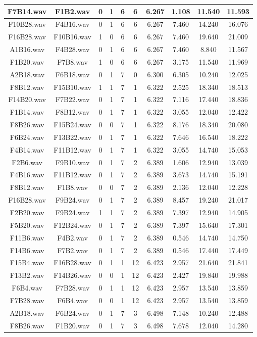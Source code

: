 \documentclass[11pt,a4paper]{book}
\begin{document}
\begin{longtable}[c]{|c|c|c|c|c|c|c|c|c|c|}
F7B14.wav&F1B2.wav&0&1&6&6&6.267&1.108&11.540&11.593\\ \hline
F10B28.wav&F4B16.wav&0&1&6&6&6.267&7.460&14.240&16.076\\ \hline
F16B28.wav&F10B16.wav&1&0&6&6&6.267&7.460&19.640&21.009\\ \hline
A1B16.wav&F4B28.wav&0&1&6&6&6.267&7.460&8.840&11.567\\ \hline
F1B20.wav&F7B8.wav&1&0&6&6&6.267&3.175&11.540&11.969\\ \hline
A2B18.wav&F6B18.wav&0&1&7&0&6.300&6.305&10.240&12.025\\ \hline
F8B12.wav&F15B10.wav&1&1&7&1&6.322&2.525&18.340&18.513\\ \hline
F14B20.wav&F7B22.wav&0&1&7&1&6.322&7.116&17.440&18.836\\ \hline
F1B14.wav&F8B12.wav&0&1&7&1&6.322&3.055&12.040&12.422\\ \hline
F8B26.wav&F15B24.wav&0&0&7&1&6.322&8.176&18.340&20.080\\ \hline
F6B24.wav&F13B22.wav&0&1&7&1&6.322&7.646&16.540&18.222\\ \hline
F4B14.wav&F11B12.wav&0&1&7&1&6.322&3.055&14.740&15.053\\ \hline
F2B6.wav&F9B10.wav&0&1&7&2&6.389&1.606&12.940&13.039\\ \hline
F4B16.wav&F11B12.wav&0&1&7&2&6.389&3.673&14.740&15.191\\ \hline
F8B12.wav&F1B8.wav&0&0&7&2&6.389&2.136&12.040&12.228\\ \hline
F16B28.wav&F9B24.wav&0&1&7&2&6.389&8.457&19.240&21.017\\ \hline
F2B20.wav&F9B24.wav&1&1&7&2&6.389&7.397&12.940&14.905\\ \hline
F5B20.wav&F12B24.wav&0&1&7&2&6.389&7.397&15.640&17.301\\ \hline
F11B6.wav&F4B2.wav&0&1&7&2&6.389&0.546&14.740&14.750\\ \hline
F14B6.wav&F7B2.wav&0&1&7&2&6.389&0.546&17.440&17.449\\ \hline
F15B4.wav&F16B28.wav&0&1&1&12&6.423&2.957&21.640&21.841\\ \hline
F13B2.wav&F14B26.wav&0&0&1&12&6.423&2.427&19.840&19.988\\ \hline
F6B4.wav&F7B28.wav&0&1&1&12&6.423&2.957&13.540&13.859\\ \hline
F7B28.wav&F6B4.wav&0&0&1&12&6.423&2.957&13.540&13.859\\ \hline
A2B18.wav&F6B24.wav&0&1&7&3&6.498&7.148&10.240&12.488\\ \hline
F8B26.wav&F1B20.wav&0&1&7&3&6.498&7.678&12.040&14.280\\ \hline

\end{longtable}
\end{document}

